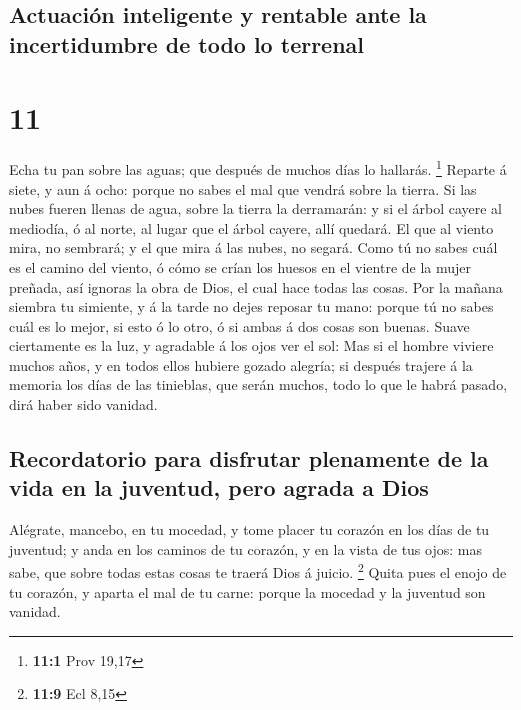 \hypertarget{actuaciuxf3n-inteligente-y-rentable-ante-la-incertidumbre-de-todo-lo-terrenal}{%
\subsection{Actuación inteligente y rentable ante la incertidumbre de
todo lo
terrenal}\label{actuaciuxf3n-inteligente-y-rentable-ante-la-incertidumbre-de-todo-lo-terrenal}}

\hypertarget{section-10}{%
\section{11}\label{section-10}}

 Echa tu pan sobre las aguas; que después de muchos días
lo hallarás. \footnote{\textbf{11:1} Prov 19,17}  Reparte
á siete, y aun á ocho: porque no sabes el mal que vendrá sobre la
tierra.  Si las nubes fueren llenas de agua, sobre la
tierra la derramarán: y si el árbol cayere al mediodía, ó al norte, al
lugar que el árbol cayere, allí quedará.  El que al viento
mira, no sembrará; y el que mira á las nubes, no segará. 
Como tú no sabes cuál es el camino del viento, ó cómo se crían los
huesos en el vientre de la mujer preñada, así ignoras la obra de Dios,
el cual hace todas las cosas.  Por la mañana siembra tu
simiente, y á la tarde no dejes reposar tu mano: porque tú no sabes cuál
es lo mejor, si esto ó lo otro, ó si ambas á dos cosas son buenas.
 Suave ciertamente es la luz, y agradable á los ojos ver
el sol:  Mas si el hombre viviere muchos años, y en todos
ellos hubiere gozado alegría; si después trajere á la memoria los días
de las tinieblas, que serán muchos, todo lo que le habrá pasado, dirá
haber sido vanidad.

\hypertarget{recordatorio-para-disfrutar-plenamente-de-la-vida-en-la-juventud-pero-agrada-a-dios}{%
\subsection{Recordatorio para disfrutar plenamente de la vida en la
juventud, pero agrada a
Dios}\label{recordatorio-para-disfrutar-plenamente-de-la-vida-en-la-juventud-pero-agrada-a-dios}}

 Alégrate, mancebo, en tu mocedad, y tome placer tu
corazón en los días de tu juventud; y anda en los caminos de tu corazón,
y en la vista de tus ojos: mas sabe, que sobre todas estas cosas te
traerá Dios á juicio. \footnote{\textbf{11:9} Ecl 8,15} 
Quita pues el enojo de tu corazón, y aparta el mal de tu carne: porque
la mocedad y la juventud son vanidad.

